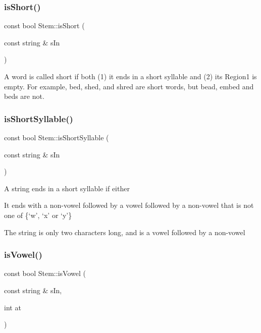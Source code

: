 \subsubsection{\texorpdfstring{is\+Short()}{isShort()}}
{\footnotesize\ttfamily const bool Stem\+::is\+Short (\begin{DoxyParamCaption}\item[{const string \&}]{s\+In }\end{DoxyParamCaption})}

A word is called short if both (1) it ends in a short syllable and (2) its Region1 is empty. For example, bed, shed, and shred are short words, but bead, embed and beds are not. \mbox{\label{class_stem_a88f66ffd8b23e3da2e955888e802c780}} 
\subsubsection{\texorpdfstring{is\+Short\+Syllable()}{isShortSyllable()}}
{\footnotesize\ttfamily const bool Stem\+::is\+Short\+Syllable (\begin{DoxyParamCaption}\item[{const string \&}]{s\+In }\end{DoxyParamCaption})}

A string ends in a short syllable if either
\begin{DoxyEnumerate}
\item It ends with a non-\/vowel followed by a vowel followed by a non-\/vowel that is not one of \{‘w’, ‘x’ or ‘y’\}
\item The string is only two characters long, and is a vowel followed by a non-\/vowel 
\end{DoxyEnumerate}\mbox{\label{class_stem_acbe5708482ee52612b29bcc6872cc7cf}} 
\subsubsection{\texorpdfstring{is\+Vowel()}{isVowel()}\hspace{0.1cm}{\footnotesize\ttfamily [1/2]}}
{\footnotesize\ttfamily const bool Stem\+::is\+Vowel (\begin{DoxyParamCaption}\item[{const string \&}]{s\+In,  }\item[{int}]{at }\end{DoxyParamCaption})}

